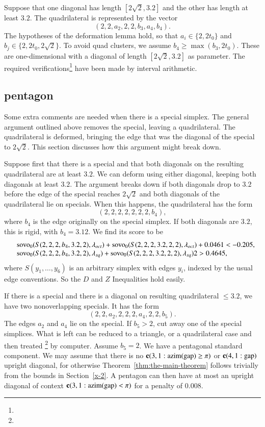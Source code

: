 Suppose that one diagonal has length $[2\sqrt{2},3.2]$ and the other has
length at least $3.2$.  The quadrilateral is represented by the vector
    $$(2,2,a_2,2,2,b_3,a_4,b_4).$$
The hypotheses of the deformation lemma hold, so that $a_i\in\{2,2t_0\}$
and $b_j\in\{2,2t_0,2\sqrt2\}$. To avoid quad clusters, we assume
$b_4\ge\max(b_3,2t_0)$. These are one-dimensional with a diagonal of
length $[2\sqrt{2},3.2]$ as parameter.
 The required verifications\footnote{} %
have been made by interval arithmetic.


\subsection{pentagon} %

Some extra comments are needed when there is a special simplex. The
general argument outlined above removes the special, leaving a
quadrilateral.  The quadrilateral is deformed, bringing the edge that
was the diagonal of the special to $2\sqrt{2}$. This section discusses
how this argument might break down.

Suppose first that there is a special and that both diagonals on the
resulting quadrilateral are at least $3.2$.  We can deform using either
diagonal, keeping both diagonals at least $3.2$. The argument breaks
down if both diagonals drop to $3.2$ before the edge of the special
reaches $2\sqrt{2}$ and both diagonals of the quadrilateral lie on
specials. When this happens, the quadrilateral has the form
    $$(2,2,2,2,2,2,2,b_4),$$
where $b_4$ is the edge originally on the special simplex.  If both
diagonals are $3.2$, this is rigid, with $b_4= 3.12$. We find its score
to be
    $$
    \begin{array}{lll}
    &{\operatorname{sovo}}_0(S(2,2,2,b_4,3.2,2),\lambda_{oct})+{\operatorname{sovo}}_0(S(2,2,2,3.2,2,2),\lambda_{oct})+0.0461<-0.205,\\
    &{\operatorname{sovo}}_0(S(2,2,2,b_4,3.2,2),\lambda_{sq})+{\operatorname{sovo}}_0(S(2,2,2,3.2,2,2),\lambda_{sq})2> 0.4645,\\
    \end{array}
    $$
where $S(y_1,\ldots,y_6)$ is an arbitrary simplex with edges $y_i$,
indexed by the usual edge conventions.
So the $D$ and $Z$ Inequalities hold easily.

If there is a special and there is a diagonal on resulting quadrilateral
$\le3.2$, we have two nonoverlapping specials.  It has the form
    $$(2,2,a_2,2,2,2,a_4,2,2,b_5).$$
The edges $a_2$ and $a_4$ lie on the special.  If $b_5>2$, cut
away one of the special simplices.  What is left can be reduced to
a triangle, or a quadrilateral case and then treated%
\footnote{} %
by computer. %
Assume
$b_5=2$.  We have a pentagonal standard component. We may assume that
there is no ${\operatorname{\bf c}}{(3,1: {\operatorname{azim}}({\operatorname{gap}}) \ge \pi)}$ or ${\operatorname{\bf c}}{(4,1:{\operatorname{gap}})}$ upright diagonal, for
otherwise Theorem~\ref{thm:the-main-theorem} follows trivially
from the bounds in Section~\ref{x-2}. A pentagon can then have at
most an upright diagonal of context ${\operatorname{\bf c}}{(3,1: {\operatorname{azim}}({\operatorname{gap}}) <\pi)}$ for a penalty of $0.008$.

